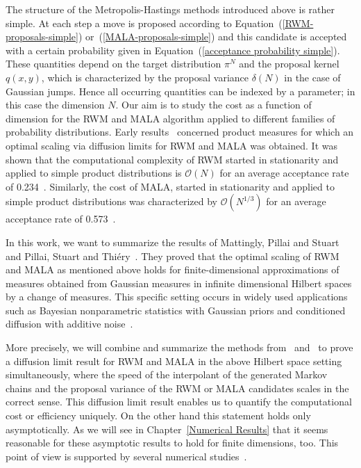 The structure of the Metropolis-Hastings methods introduced above is rather simple. At each step a move is proposed according to Equation~(\ref{RWM-proposals-simple}) or~(\ref{MALA-proposals-simple}) and this candidate is accepted with a certain probability given in Equation~(\ref{acceptance probability simple}). These quantities depend on the target distribution $ \pi^{N} $ and the proposal kernel $ q(x,y) $, which is characterized by the proposal variance $ \delta(N) $ in the case of Gaussian jumps. Hence all occurring quantities can be indexed by a parameter; in this case the dimension $N$. Our aim is to study the cost as a function of dimension for the RWM and MALA algorithm applied to different families of probability distributions. Early results~\autocite{Roberts1997, Roberts1998} concerned product measures for which an optimal scaling via diffusion limits for RWM and MALA was obtained. It was shown that the computational complexity of RWM started in stationarity and applied to simple product distributions is $\mathcal{O}(N)$ for an average acceptance rate of 0.234~\autocite{Roberts1997}. Similarly, the cost of MALA, started in stationarity and applied to simple product distributions was characterized by $\mathcal{O}(N^{1/3})$ for an average acceptance rate of 0.573~\autocite{Roberts1998}. 

In this work, we want to summarize the results of Mattingly, Pillai and Stuart~\autocite{Mattingly2010} and Pillai, Stuart and Thi\'{e}ry~\autocite{Pillai2012}. They proved that the optimal scaling of RWM and MALA as mentioned above holds for finite-dimensional approximations of measures obtained from Gaussian measures in infinite dimensional Hilbert spaces by a change of measures. This specific setting occurs in widely used applications such as Bayesian nonparametric statistics with Gaussian priors and conditioned diffusion with additive noise~\autocite{Beskos2009, Stuart2010}.

More precisely, we will combine and summarize the methods from~\autocite{Mattingly2010} and~\autocite{Pillai2012} to prove a diffusion limit result for RWM and MALA in the above Hilbert space setting simultaneously, where the speed of the interpolant of the generated Markov chains and the proposal variance of the RWM or MALA candidates scales in the correct sense. This diffusion limit result enables us to quantify the computational cost or efficiency uniquely. On the other hand this statement holds only asymptotically. As we will see in Chapter~\ref{Numerical Results} that it seems reasonable for these asymptotic results to hold for finite dimensions, too. This point of view is supported by several numerical studies~\autocite{Beskos2008, Gelman1996, Roberts2001}.




